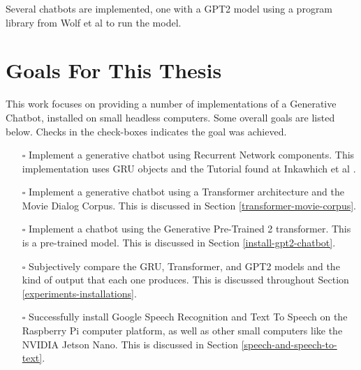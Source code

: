 Several chatbots are implemented, one with a GPT2 model using a program library from Wolf et al \cite{Wolf2019HuggingFacesTS} to run the model.



\section{Goals For This Thesis}
This work focuses on providing a number of implementations of a Generative Chatbot, installed on small headless computers. Some overall goals are listed below. Checks in the check-boxes indicates the goal was achieved.

\begin{itemize}
	
	\item[\rlap{\raisebox{0.3ex}{\hspace{0.4ex}\tiny \ding{52}}}$\square$] Implement a generative chatbot using Recurrent Network components. This implementation uses GRU objects and the Tutorial found at Inkawhich et al \cite{2018Inkawhich}.
	
	\item[\rlap{\raisebox{0.3ex}{\hspace{0.4ex}\tiny \ding{52}}}$\square$] Implement a generative chatbot using a Transformer architecture and the Movie Dialog Corpus. This is discussed in Section \ref{transformer-movie-corpus}. %
	
	\item[\rlap{\raisebox{0.3ex}{\hspace{0.4ex}\tiny \ding{52}}}$\square$] Implement a chatbot using the Generative Pre-Trained 2 transformer. This is a pre-trained model. This is discussed in Section \ref{install-gpt2-chatbot}.
	
	\item[\rlap{\raisebox{0.3ex}{\hspace{0.4ex}\tiny \ding{52}}}$\square$] Subjectively compare the GRU, Transformer, and GPT2 models and the kind of output that each one produces. This is discussed throughout Section \ref{experiments-installations}.
	
	\item[\rlap{\raisebox{0.3ex}{\hspace{0.4ex}\tiny \ding{52}}}$\square$] Successfully install Google Speech Recognition and Text To Speech on the Raspberry Pi computer platform, as well as other small computers like the NVIDIA Jetson Nano. This is discussed in Section \ref{speech-and-speech-to-text}.
	

\end{itemize}

